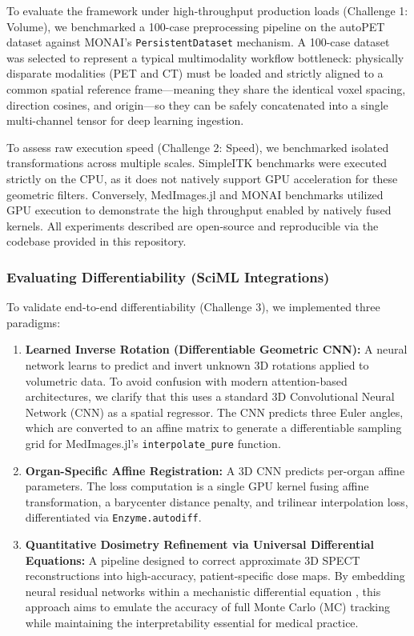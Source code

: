 \documentclass[10pt,letterpaper]{article}
\begin{document}
To evaluate the framework under high-throughput production loads (Challenge 1: Volume), we benchmarked a 100-case preprocessing pipeline on the autoPET dataset \cite{Dexl_2025} against MONAI's \texttt{PersistentDataset} mechanism. A 100-case dataset was selected to represent a typical multimodality workflow bottleneck: physically disparate modalities (PET and CT) must be loaded and strictly aligned to a common spatial reference frame---meaning they share the identical voxel spacing, direction cosines, and origin---so they can be safely concatenated into a single multi-channel tensor for deep learning ingestion. 

To assess raw execution speed (Challenge 2: Speed), we benchmarked isolated transformations across multiple scales. SimpleITK benchmarks were executed strictly on the CPU, as it does not natively support GPU acceleration for these geometric filters. Conversely, MedImages.jl and MONAI benchmarks utilized GPU execution to demonstrate the high throughput enabled by natively fused kernels. All experiments described are open-source and reproducible via the codebase provided in this repository.

\subsubsection*{Evaluating Differentiability (SciML Integrations)}
To validate end-to-end differentiability (Challenge 3), we implemented three paradigms:
\begin{enumerate}
    \item \textbf{Learned Inverse Rotation (Differentiable Geometric CNN):} A neural network learns to predict and invert unknown 3D rotations applied to volumetric data. To avoid confusion with modern attention-based architectures, we clarify that this uses a standard 3D Convolutional Neural Network (CNN) as a spatial regressor. The CNN predicts three Euler angles, which are converted to an affine matrix to generate a differentiable sampling grid for MedImages.jl's \texttt{interpolate\_pure} function. 
    \item \textbf{Organ-Specific Affine Registration:} A 3D CNN predicts per-organ affine parameters. The loss computation is a single GPU kernel fusing affine transformation, a barycenter distance penalty, and trilinear interpolation loss, differentiated via \texttt{Enzyme.autodiff}.
    \item \textbf{Quantitative Dosimetry Refinement via Universal Differential Equations:} A pipeline designed to correct approximate 3D SPECT reconstructions into high-accuracy, patient-specific dose maps. By embedding neural residual networks within a mechanistic differential equation \cite{Berman_2024}, this approach aims to emulate the accuracy of full Monte Carlo (MC) tracking while maintaining the interpretability essential for medical practice.
\end{enumerate}
\end{document}
